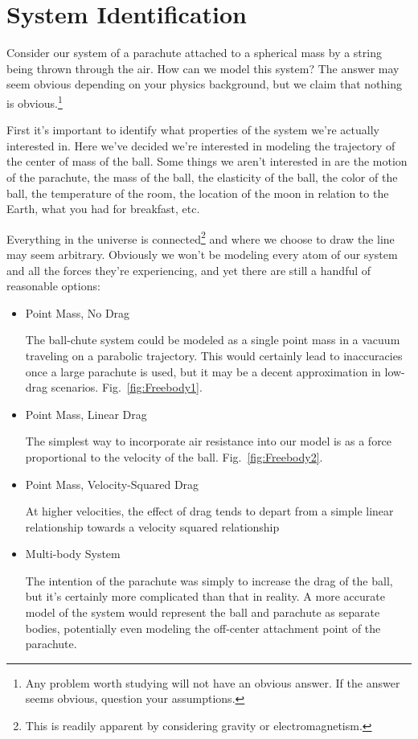 \section{System Identification}

Consider our system of a parachute attached to a spherical mass by a string being thrown through the air. How can we model this system? The answer may seem obvious depending on your physics background, but we claim that nothing is obvious.\footnote{Any problem worth studying will not have an obvious answer. If the answer seems obvious, question your assumptions.}

First it's important to identify what properties of the system we're actually interested in. Here we've decided we're interested in modeling the trajectory of the center of mass of the ball. Some things we aren't interested in are the motion of the parachute, the mass of the ball, the elasticity of the ball, the color of the ball, the temperature of the room, the location of the moon in relation to the Earth, what you had for breakfast, etc. 

Everything in the universe is connected\footnote{This is readily apparent by considering gravity or electromagnetism.} and where we choose to draw the line may seem arbitrary. Obviously we won't be modeling every atom of our system and all the forces they're experiencing, and yet there are still a handful of reasonable options:

\begin{itemize}
\item Point Mass, No Drag

The ball-chute system could be modeled as a single point mass in a vacuum traveling on a parabolic trajectory. This would certainly lead to inaccuracies once a large parachute is used, but it may be a decent approximation in low-drag scenarios. Fig.~\ref{fig:Freebody1}.

\item Point Mass, Linear Drag 

The simplest way to incorporate air resistance into our model is as a force proportional to the velocity of the ball. Fig.~\ref{fig:Freebody2}.

\item Point Mass, Velocity-Squared Drag

At higher velocities, the effect of drag tends to depart from a simple linear relationship towards a velocity squared relationship

\item Multi-body System

The intention of the parachute was simply to increase the drag of the ball, but it's certainly more complicated than that in reality. A more accurate model of the system would represent the ball and parachute as separate bodies, potentially even modeling the off-center attachment point of the parachute. 

\end{itemize}

